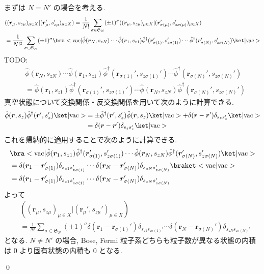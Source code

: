 \documentclass[uplatex,dvipdfmx,a4paper,11pt]{jlreq}
\makeatletter
\renewcommand{\SS}{\mathfrak{S}}
\newcommand{\rr}{\bm{r}}
\numberwithin{equation}{section}
\theoremstyle{definition}
\renewenvironment{proof}[1][\proofname]{\par
  \normalfont
  \topsep6\p@\@plus6\p@ \trivlist
  \item[\hskip\labelsep{\bfseries #1}\@addpunct{\bfseries}]\ignorespaces\quad\par
}{
  \qed\endtrivlist\@endpefalse
}
\renewcommand\proofname{証明}
\makeatother
\begin{document}
\begin{proof}
  まずは $N = N'$ の場合を考える.
  \begin{align}
     & ((\rr_{\mu}, s_{z\mu})_{\mu\in X}|(\rr_{\mu}', s_{z\mu}')_{\mu\in X}) = \frac{1}{N!}\sum_{\sigma\in\SS_N}(\pm 1)^\sigma((\rr_{\mu}, s_{z\mu})_{\mu\in X}|(\rr_{\sigma(\mu)}', s_{z\sigma(\mu)}')_{\mu\in X})                                                    \\
     & = \frac{1}{N!^2}\sum_{\sigma\in\SS_N}(\pm 1)^\sigma\bra<\mathrm{vac}|\hat{\phi}(\rr_N, s_{zN})\cdots\hat{\phi}(\rr_1, s_{z1})\hat{\phi}^\dagger(\rr_{\sigma(1)}', s_{z\sigma(1)}')\cdots\hat{\phi}^\dagger(\rr_{\sigma(N)}', s_{z\sigma(N)}')\ket|\mathrm{vac}>
  \end{align}
  TODO:
  \begin{align}
     & \hat{\phi}(\rr_N, s_{zN})\cdots\hat{\phi}(\rr_1, s_{z1})\hat{\phi}^\dagger(\rr_{\sigma(1)}', s_{z\sigma(1)}')\cdots\hat{\phi}^\dagger(\rr_{\sigma(N)}', s_{z\sigma(N)}') \\
     & = \hat{\phi}(\rr_1, s_{z1})\hat{\phi}^\dagger(\rr_{\sigma(1)}', s_{z\sigma(1)}')\cdots\hat{\phi}(\rr_N, s_{zN})\hat{\phi}^\dagger(\rr_{\sigma(N)}', s_{z\sigma(N)}')
  \end{align}
  真空状態について交換関係・反交換関係を用いて次のように計算できる.
  \begin{align}
    \hat{\phi}(\rr, s_z)\hat{\phi}^\dagger(\rr', s_z')\ket|\mathrm{vac}> & = \pm\hat{\phi}^\dagger(\rr', s_z')\hat{\phi}(\rr, s_z)\ket|\mathrm{vac}> + \delta(\rr - \rr')\delta_{s_zs_z'}\ket|\mathrm{vac}> \\
                                                                         & = \delta(\rr - \rr')\delta_{s_zs_z'}\ket|\mathrm{vac}>
  \end{align}
  これを帰納的に適用することで次のように計算できる.
  \begin{align}
     & \bra<\mathrm{vac}|\hat{\phi}(\rr_1, s_{z1})\hat{\phi}^\dagger(\rr_{\sigma(1)}', s_{z\sigma(1)}')\cdots\hat{\phi}(\rr_N, s_{zN})\hat{\phi}^\dagger(\rr_{\sigma(N)}', s_{z\sigma(N)}')\ket|\mathrm{vac}> \\
     & = \delta(\rr_1 - \rr_{\sigma(1)}')\delta_{s_{z1}s_{z\sigma(1)}'}\cdots\delta(\rr_N - \rr_{\sigma(N)}')\delta_{s_{zN}s_{z\sigma(N)}'}\braket<\mathrm{vac}|\mathrm{vac}>                                 \\
     & = \delta(\rr_1 - \rr_{\sigma(1)}')\delta_{s_{z1}s_{z\sigma(1)}'}\cdots\delta(\rr_N - \rr_{\sigma(N)}')\delta_{s_{zN}s_{z\sigma(N)}'}
  \end{align}
  よって
  \begin{align}
     & ((\rr_{\mu}, s_{z\mu})_{\mu\in X}|(\rr_{\mu}', s_{z\mu}')_{\mu\in X})                                                                                                               \\
     & = \frac{1}{N!}\sum_{\sigma\in\SS_N}(\pm 1)^\sigma\delta(\rr_1 - \rr_{\sigma(1)}')\delta_{s_{z1}s_{z\sigma(1)}'}\cdots\delta(\rr_N - \rr_{\sigma(N)}')\delta_{s_{zN}s_{z\sigma(N)}'}
  \end{align}
  となる. $N \neq N'$ の場合, Bose, Fermi 粒子系どちらも粒子数が異なる状態の内積は 0 より固有状態の内積も 0 となる.
\end{proof}
\end{document}
